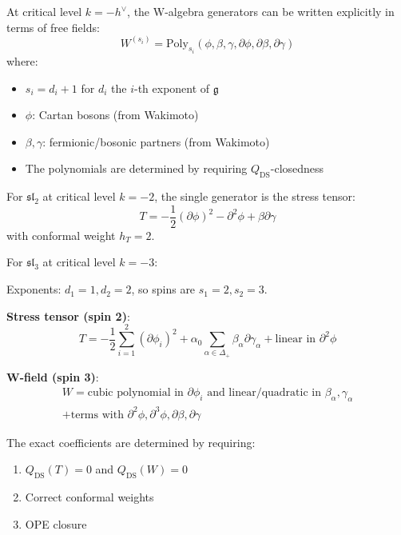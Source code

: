 \begin{theorem}\label{thm:generators-screening}
At critical level $k = -h^\vee$, the W-algebra generators can be written explicitly in terms of free fields:
\begin{equation}
W^{(s_i)} = \text{Poly}_{s_i}(\phi, \beta, \gamma, \partial\phi, \partial\beta, \partial\gamma)
\end{equation}
where:
\begin{itemize}
\item $s_i = d_i + 1$ for $d_i$ the $i$-th exponent of $\mathfrak{g}$
\item $\phi$: Cartan bosons (from Wakimoto)
\item $\beta, \gamma$: fermionic/bosonic partners (from Wakimoto)
\item The polynomials are determined by requiring $Q_{\text{DS}}$-closedness
\end{itemize}
\end{theorem}

\begin{example}
For $\mathfrak{sl}_2$ at critical level $k = -2$, the single generator is the stress tensor:
\begin{equation}
T = -\frac{1}{2}(\partial \phi)^2 - \partial^2 \phi + \beta \partial \gamma
\end{equation}
with conformal weight $h_T = 2$.
\end{example}

\begin{example}
For $\mathfrak{sl}_3$ at critical level $k = -3$:

Exponents: $d_1 = 1, d_2 = 2$, so spins are $s_1 = 2, s_2 = 3$.

\textbf{Stress tensor (spin 2)}:
\begin{equation}
T = -\frac{1}{2} \sum_{i=1}^2 (\partial \phi_i)^2 + \alpha_0 \sum_{\alpha \in \Delta_+} \beta_\alpha \partial \gamma_\alpha + \text{linear in } \partial^2\phi
\end{equation}

\textbf{W-field (spin 3)}:
\begin{multline}
W = \text{cubic polynomial in } \partial\phi_i \text{ and linear/quadratic in } \beta_\alpha, \gamma_\alpha \\
+ \text{terms with } \partial^2\phi, \partial^3\phi, \partial\beta, \partial\gamma
\end{multline}

The exact coefficients are determined by requiring:
\begin{enumerate}
\item $Q_{\text{DS}}(T) = 0$ and $Q_{\text{DS}}(W) = 0$
\item Correct conformal weights
\item OPE closure
\end{enumerate}
\end{example}

